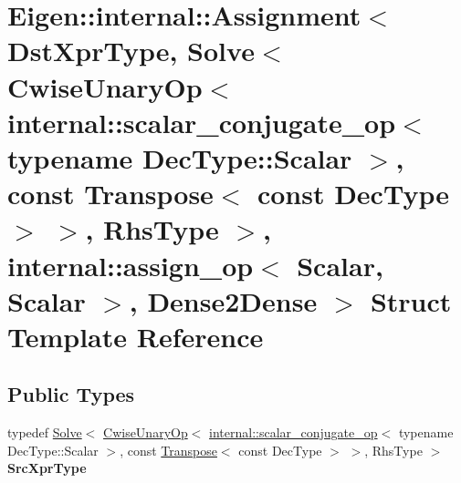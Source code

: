 \hypertarget{struct_eigen_1_1internal_1_1_assignment_3_01_dst_xpr_type_00_01_solve_3_01_cwise_unary_op_3_01in7a0cdfc0a6924bfcd9bc281e374a4ff8}{}\section{Eigen\+::internal\+::Assignment$<$ Dst\+Xpr\+Type, Solve$<$ Cwise\+Unary\+Op$<$ internal\+::scalar\+\_\+conjugate\+\_\+op$<$ typename Dec\+Type\+::Scalar $>$, const Transpose$<$ const Dec\+Type $>$ $>$, Rhs\+Type $>$, internal\+::assign\+\_\+op$<$ Scalar, Scalar $>$, Dense2\+Dense $>$ Struct Template Reference}
\label{struct_eigen_1_1internal_1_1_assignment_3_01_dst_xpr_type_00_01_solve_3_01_cwise_unary_op_3_01in7a0cdfc0a6924bfcd9bc281e374a4ff8}
\subsection*{Public Types}
\begin{DoxyCompactItemize}
\item 
\mbox{\label{struct_eigen_1_1internal_1_1_assignment_3_01_dst_xpr_type_00_01_solve_3_01_cwise_unary_op_3_01in7a0cdfc0a6924bfcd9bc281e374a4ff8_aca0119603485d050980a0b80e38bf298}} 
typedef \mbox{\hyperlink{class_eigen_1_1_solve}{Solve}}$<$ \mbox{\hyperlink{class_eigen_1_1_cwise_unary_op}{Cwise\+Unary\+Op}}$<$ \mbox{\hyperlink{struct_eigen_1_1internal_1_1scalar__conjugate__op}{internal\+::scalar\+\_\+conjugate\+\_\+op}}$<$ typename Dec\+Type\+::\+Scalar $>$, const \mbox{\hyperlink{class_eigen_1_1_transpose}{Transpose}}$<$ const Dec\+Type $>$ $>$, Rhs\+Type $>$ {\bfseries Src\+Xpr\+Type}
\end{DoxyCompactItemize}
